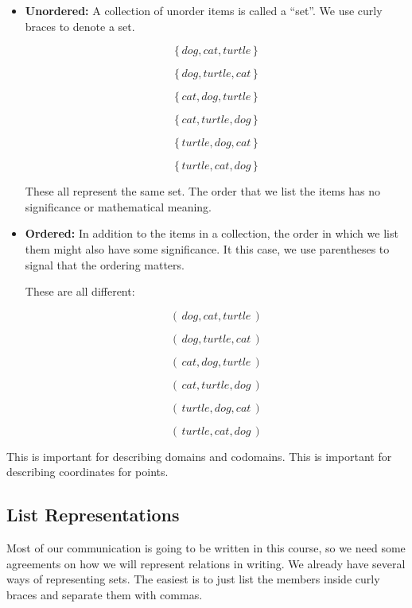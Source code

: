 \documentclass{ximera}
\begin{document}
\begin{itemize}
\item \textbf{\textcolor{blue!55!black}{Unordered:}}  A collection of unorder items is called a ``set''.  We use curly braces to denote a set.

\[
\{ \, dog, cat, turtle \, \}
\]

\[
\{ \, dog, turtle, cat \, \}
\]

\[
\{ \, cat, dog, turtle \, \}
\]

\[
\{ \, cat, turtle, dog \, \}
\]

\[
\{ \, turtle, dog, cat \, \}
\]

\[
\{ \, turtle, cat, dog \, \}
\]

These all represent the same set.  The order that we list the items has no significance or mathematical meaning.


\item \textbf{\textcolor{blue!55!black}{Ordered:}} In addition to the items in a collection, the order in which we list them might also have some significance.  It this case, we use parentheses to signal that the ordering matters.


These are all different:

\[
( \, dog, cat, turtle \, )
\]

\[
( \, dog, turtle, cat \, )
\]

\[
( \, cat, dog, turtle \, )
\]

\[
( \, cat, turtle, dog \, )
\]

\[
( \, turtle, dog, cat \, )
\]

\[
( \, turtle, cat, dog \, )
\]


\end{itemize}


This is important for describing domains and codomains.  This is important for describing coordinates for points. \\













\subsection{List Representations}

Most of our communication is going to be written in this course, so we need some agreements on how we will represent relations in writing.  We already have several ways of representing sets.  The easiest is to just list the members inside curly braces and separate them with commas.
\end{document}
